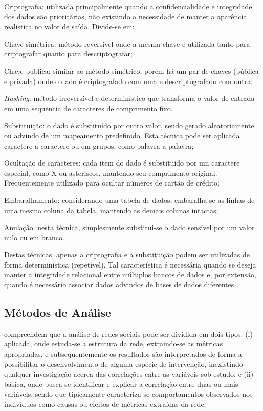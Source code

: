 \begin{alineas}
    \item Criptografia: utilizada principalmente quando a confidencialidade e integridade dos dados são prioritárias, não existindo a necessidade de manter a aparência realística no valor de saída. Divide-se em:
    \begin{alineas}
        \item Chave simétrica: método reversível onde a mesma chave é utilizada tanto para criptografar quanto para descriptografar;
        \item Chave pública: similar ao método simétrico, porém há um par de chaves (pública e privada) onde o dado é criptografado com uma e descriptografado com outra;
        \item \textit{Hashing}: método irreversível e determinístico que transforma o valor de entrada em uma sequência de caracteres de comprimento fixo.
    \end{alineas}
    \item Substituição: o dado é substituído por outro valor, sendo gerado aleatoriamente ou advindo de um mapeamento predefinido. Esta técnica pode ser aplicada caractere a caractere ou em grupos, como palavra a palavra;
    \item Ocultação de caracteres: cada item do dado é substituído por um caractere especial, como X ou asteriscos, mantendo seu comprimento original. Frequentemente utilizado para ocultar números de cartão de crédito;
    \item Embaralhamento: considerando uma tabela de dados, embaralha-se as linhas de uma mesma coluna da tabela, mantendo as demais colunas intactas;
    \item Anulação: nesta técnica, simplesmente substitui-se o dado sensível por um valor nulo ou em branco.
\end{alineas}

Destas técnicas, apenas a criptografia e a substituição podem ser utilizadas de forma determinística (repetível). Tal característica é necessária quando se deseja manter a integridade relacional entre múltiplos bancos de dados e, por extensão, quando é necessário associar dados advindos de bases de dados diferentes \cite{Raghunathan2013}.

\subsection{Métodos de Análise} \label{sec:analysis}

 compreendem que a análise de redes sociais pode ser dividida em dois tipos: (i) aplicada, onde estuda-se a estrutura da rede, extraindo-se as métricas apropriadas, e subsequentemente os resultados são interpretados de forma a possibilitar o desenvolvimento de alguma espécie de intervenção, inexistindo qualquer investigação acerca das correlações entre as variáveis sob estudo; e (ii) básica, onde busca-se identificar e explicar a correlação entre duas ou mais variáveis, sendo que tipicamente caracteriza-se comportamentos observados nos indivíduos como causas ou efeitos de métricas extraídas da rede.

